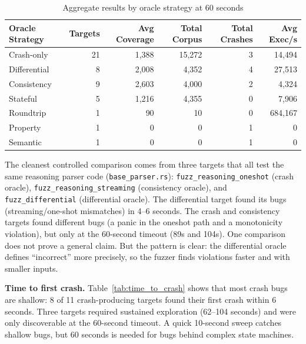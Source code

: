 \documentclass[11pt]{article}
\begin{document}
\begin{table}[H]
\centering
\caption{Aggregate results by oracle strategy at 60 seconds}
\label{tab:oracle_ablation}
\begin{tabular}{@{}lrrrrr@{}}
\toprule
Oracle Strategy & Targets & Avg Coverage & Total Corpus & Total Crashes & Avg Exec/s \\
\midrule
Crash-only   & 21 & 1,388 & 15,272 & 3 & 14,494 \\
Differential & 8  & 2,008 & 4,352  & 4 & 27,513 \\
Consistency  & 9  & 2,603 & 4,000  & 2 & 4,324 \\
Stateful     & 5  & 1,216 & 4,355  & 0 & 7,906 \\
Roundtrip    & 1  & 90    & 10     & 0 & 684,167 \\
Property     & 1  & 0     & 0      & 1 & 0 \\
Semantic     & 1  & 0     & 0      & 1 & 0 \\
\bottomrule
\end{tabular}
\end{table}

The cleanest controlled comparison comes from three targets that all test the same reasoning parser code (\texttt{base\_parser.rs}): \texttt{fuzz\_reasoning\_oneshot} (crash oracle), \texttt{fuzz\_reasoning\_streaming} (consistency oracle), and \texttt{fuzz\_differential} (differential oracle). The differential target found its bugs (streaming/one-shot mismatches) in 4--6 seconds. The crash and consistency targets found different bugs (a panic in the oneshot path and a monotonicity violation), but only at the 60-second timeout (89s and 104s). One comparison does not prove a general claim. But the pattern is clear: the differential oracle defines ``incorrect'' more precisely, so the fuzzer finds violations faster and with smaller inputs.

\textbf{Time to first crash.} Table~\ref{tab:time_to_crash} shows that most crash bugs are shallow: 8 of 11 crash-producing targets found their first crash within 6 seconds. Three targets required sustained exploration (62--104 seconds) and were only discoverable at the 60-second timeout. A quick 10-second sweep catches shallow bugs, but 60 seconds is needed for bugs behind complex state machines.
\end{document}
